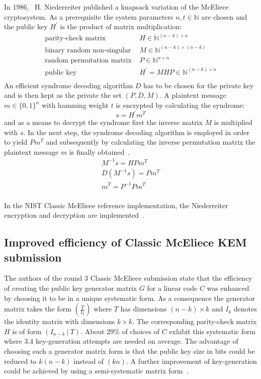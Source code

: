 \documentclass[11pt,
  oneside,openany,    %
]{scrreprt}
\begin{document}
In 1986,~\cite{niederreiter} H. Niederreiter published a knapsack variation of the McEliece cryptosystem. As a prerequisite the system parameters $n, t \in \mathbb{N}$ are chosen and the public key $H^{\prime}$ is the product of matrix multiplication: 
\begin{align*}
\text{parity-check matrix } & H \in \mathbb{N}^{(n-k) \times n} \\
\text{binary random non-singular } & M \in \mathbb{N}^{(n-k) \times (n-k)}\\
\text{random permutation matrix } & P \in \mathbb{N}^{n \times n}\\
\text{public key } & H^{\prime} = MHP \in \mathbb{N}^{(n-k) \times n}\\ 
\end{align*}
An efficient syndrome decoding algorithm $D$ has to be chosen for the private key and is then kept as the private the set $(P, D, M)$. A plaintext message $m \in \{0,1\}^n$ with hamming weight $t$ is encrypted by calculating the syndrome:
\begin{equation*}
s = H^{\prime}m^{T}
\end{equation*}
and as a means to decrypt the syndrome first the inverse matrix $M$ is multiplied with $s$. In the next step, the syndrome decoding algorithm is employed in order to yield $Pm^{T}$ and subsequently by calculating the inverse permutation matrix the plaintext message $m$ is finally obtained~\cite{engelbertOverbeckSchmidt}.
\begin{gather*}
M^{-1}s = HPm^{T}\\
D(M^{-1}s) = Pm^{T}\\
m^{T} = P^{-1}Pm^{T}\\
\end{gather*}

In the NIST Classic McEliece reference implementation, the Niederreiter encryption and decryption are implemented~\cite{McBits}.

\subsection{Improved efficiency of Classic McEliece KEM submission}
The authors of the round 3 Classic McEliece submission state that the efficiency of creating the public key generator matrix $G$ for a linear code $C$ was enhanced by choosing it to be in a unique systematic form. As a consequence the generator matrix takes the form $\left( \frac{T}{I_{k}} \right)$ where $T$ has dimensions $(n - k) \times k$ and $I_{k}$ denotes the identity matrix with dimensions $k \times k$. The corresponding parity-check matrix $H$ is of form $(I_{n-k} \ | \ T)$. About 29\% of choices of $C$ exhibit this systematic form where 3.4 key-generation attempts are needed on average. The advantage of choosing such a generator matrix form is that the public key size in bits could be reduced to $k(n-k)$ instead of $(kn)$. A further improvement of key-generation could be achieved by using a semi-systematic matrix form~\cite{classicMcElieceSubmission3}.
\end{document}
